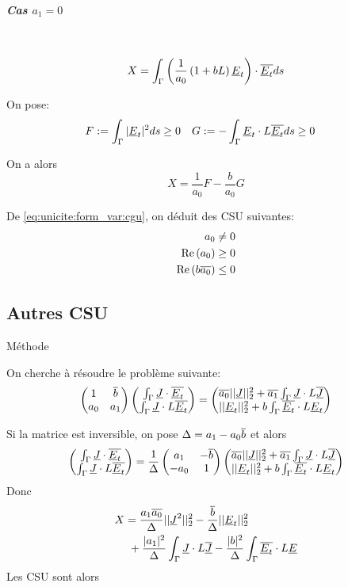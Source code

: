 \subparagraph{Cas $a_1=0$}
~
\[
X = \int_\Gamma \left( \dfrac{1}{a_0}\left(1+bL\right)\underline{E}_t\right) \cdot {\overline{\underline{E}_t}} ds
\]

On pose:
\begin{align*}
F&:= \int_\Gamma | \underline{E}_t | ^2 ds \ge 0 & G &:= -\int_\Gamma \underline{E}_t \cdot L{\overline{\underline{E}_t}} ds \ge 0
\end{align*}

On a alors
\begin{equation}
\label{eq:unicite:form_var:decomp_cgu_ci1_a1_nul}
X = \frac{1}{a_0}F - \frac{b}{a_0}G
\end{equation}

De \eqref{eq:unicite:form_var:cgu}, on déduit des CSU suivantes:
\begin{align}
a_0 \not= 0\\
\operatorname{Re}\left(a_0\right) \ge 0\\
\operatorname{Re}\left(b{\overline{a_0}}\right) \le 0
\end{align}




\subsection{Autres CSU}
Méthode \cite{stupfel_implementation_2015}

On cherche à résoudre le problème suivante:
\[
\begin{pmatrix}
1 & {\overline{b}} \\
a_0 & a_1
\end{pmatrix}
\begin{pmatrix}
\int_\Gamma \underline{J} \cdot {\overline{\underline{E}_t}} \\
\int_\Gamma \underline{J}\cdot L{\overline{\underline{E}_t}}
\end{pmatrix}
=
\begin{pmatrix}
{\overline{a_0}}||\underline{J}||_2^2 + {\overline{a_1}}\int_\Gamma \underline{J} \cdot L{\overline{\underline{J}}} \\
||\underline{E}_t||_2^2 + b\int_\Gamma {\overline{\underline{E}_t}} \cdot L\underline{E}_t
\end{pmatrix}
\]

Si la matrice est inversible, on pose $\Delta = a_1 - a_0{\overline{b}}$ et alors
\[
\begin{pmatrix}
\int_\Gamma \underline{J} \cdot {\overline{\underline{E}_t}} \\
\int_\Gamma \underline{J}\cdot L{\overline{\underline{E}_t}}
\end{pmatrix}
=\dfrac{1}{\Delta}
\begin{pmatrix}
a_1 & -{\overline{b}} \\
-a_0 & 1
\end{pmatrix}
\begin{pmatrix}
{\overline{a_0}}||\underline{J}||_2^2 + {\overline{a_1}}\int_\Gamma \underline{J} \cdot L{\overline{\underline{J}}} \\
||\underline{E}_t||_2^2 + b\int_\Gamma {\overline{\underline{E}_t}} \cdot L\underline{E}_t
\end{pmatrix}
\]
Donc
\begin{align*}
X &=  \dfrac{a_1{\overline{a_0}}}{\Delta}||\underline{J}^2||_2^2 - \dfrac{{\overline{b}}}{\Delta}||\underline{E}_t||_2^2 \\
&~+\dfrac{|a_1|^2}{\Delta}\int_\Gamma\underline{J}\cdot L {\overline{\underline{J}}} - \dfrac{|b|^2}{\Delta}\int_\Gamma{\overline{\underline{E}_t}}\cdot L\underline{E}
\end{align*}
Les CSU sont alors

